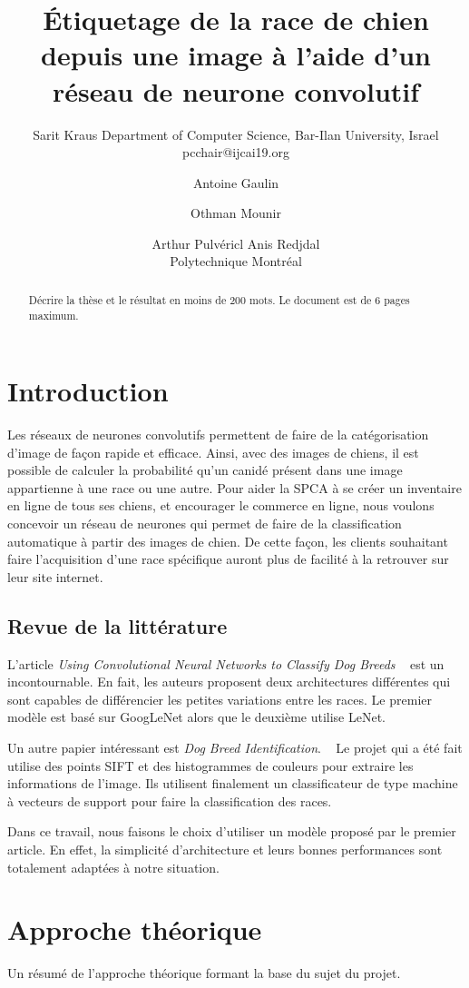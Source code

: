 \documentclass{article}
\title{Étiquetage de la race de chien depuis une image à l'aide d'un réseau de neurone convolutif}
\author{
    Sarit Kraus
    \affiliations
    Department of Computer Science, Bar-Ilan University, Israel \emails
    pcchair@ijcai19.org
}
\author{
Antoine Gaulin\and
Othman Mounir\and
Arthur Pulvéricl\And
Anis Redjdal\\
\affiliations
Polytechnique Montréal\\
}
\begin{document}
\maketitle

\begin{abstract}
Décrire la thèse et le résultat en moins de 200 mots. Le document est de 6 pages maximum.
\end{abstract}

\section{Introduction}
Les réseaux de neurones convolutifs permettent de faire de la catégorisation d'image de façon rapide et efficace. Ainsi, avec des images de chiens, il est possible de calculer la
probabilité qu'un canidé présent dans une image appartienne à une race ou une autre. Pour aider la SPCA à se créer un inventaire en ligne de tous ses chiens, et encourager
le commerce en ligne, nous voulons concevoir un réseau de neurones qui permet de faire de la classification automatique à partir des images de chien. De cette façon, les clients
souhaitant faire l'acquisition d'une race spécifique auront plus de facilité à la retrouver sur leur site internet. 

\subsection{Revue de la littérature}
L'article \textit{Using Convolutional Neural Networks to Classify Dog Breeds} ~\cite{fcdh_FinalReport} est un incontournable. En fait, les auteurs proposent deux architectures
différentes qui sont capables de différencier les petites variations entre les races. Le premier modèle est basé sur GoogLeNet alors que le deuxième utilise LeNet.

Un autre papier intéressant est \textit{Dog Breed Identification}. ~\cite{output} Le projet qui a été fait utilise des points SIFT et des histogrammes de couleurs pour extraire les
informations de l'image. Ils utilisent finalement un classificateur de type machine à vecteurs de support pour faire la classification des races.

Dans ce travail, nous faisons le choix d'utiliser un modèle proposé par le premier article. En effet, la simplicité d’architecture et leurs bonnes performances sont totalement adaptées 
à notre situation. 

\section{Approche théorique}
Un résumé de l'approche théorique formant la base du sujet du projet.
\end{document}
